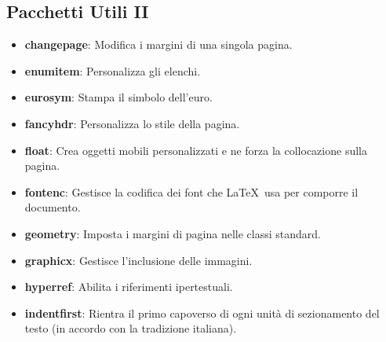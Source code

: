 \documentclass{article}
\begin{document}
            \subsection{Pacchetti Utili II}
                \begin{itemize}
                    \item \textbf{changepage}: Modifica i margini di una singola pagina.
                    \item \textbf{enumitem}: Personalizza gli elenchi.
                    \item \textbf{eurosym}: Stampa il simbolo dell'euro.
                    \item \textbf{fancyhdr}: Personalizza lo stile della pagina.
                    \item \textbf{float}: Crea oggetti mobili personalizzati e ne forza la collocazione sulla pagina.
                    \item \textbf{fontenc}: Gestisce la codifica dei font che \LaTeX\ usa per comporre il documento.
                    \item \textbf{geometry}: Imposta i margini di pagina nelle classi standard.
                    \item \textbf{graphicx}: Gestisce l'inclusione delle immagini.
                    \item \textbf{hyperref}: Abilita i riferimenti ipertestuali.
                    \item \textbf{indentfirst}: Rientra il primo capoverso di ogni unità di sezionamento del testo (in accordo con la tradizione italiana).
                \end{itemize}
\end{document}
